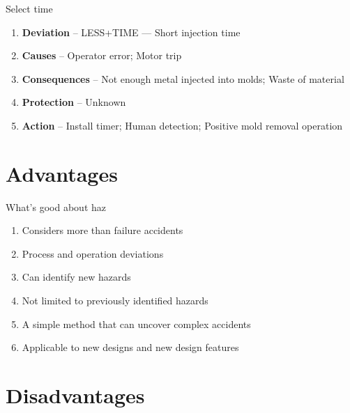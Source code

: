 \documentclass[aspectratio=1610,pdftex,dvipsnames,compress,xcolor={dvipsnames}]{beamer}
\newcommand{\acs}{\acrshort} %
\begin{document}
\begin{frame}{Select time}
    \begin{enumerate}[series=outerlist,topsep=0pt,itemsep=21pt,leftmargin=*,label=(\arabic*)]
        \item[]\textbf{Deviation} -- LESS+TIME --- Short injection time
        \item[]\textbf{Causes} -- Operator error; Motor trip
        \item[]\textbf{Consequences} -- Not enough metal injected into molds; Waste of material
        \item[]\textbf{Protection} -- Unknown
        \item[]\textbf{Action} -- Install timer; Human detection; Positive mold removal operation
    \end{enumerate}
\end{frame}


\section{Advantages}


\addtocounter{framenumber}{-1}
\begin{frame}{What's good about \acs{haz}}
    \begin{enumerate}[series=outerlist,topsep=0pt,itemsep=15pt,leftmargin=*,label=(\arabic*)]
        \item[]Considers more than failure accidents  
        \item[]Process and operation deviations
        \item[]Can identify new hazards  
        \item[]Not limited to previously identified hazards
        \item[]A simple method that can uncover complex accidents  
        \item[]Applicable to new designs and new design features
    \end{enumerate}
\end{frame}


\section{Disadvantages}
\end{document}
